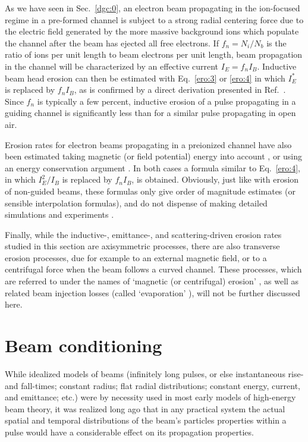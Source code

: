 \documentclass [12pt,a4paper,     ]{report} %
\begin{document}
    As we have seen in Sec.~\ref{dgc:0}, an electron beam propagating in the ion-focused regime in a pre-formed channel is subject to a strong radial centering force due to the electric field generated by the more massive background ions which populate the channel after the beam has ejected all free electrons.  If $f_n = N_i/N_b$ is the ratio of ions per unit length to beam electrons per unit length, beam propagation in the channel will be characterized by an effective current $I_E=f_nI_B$.   Inductive beam head erosion can then be estimated with Eq.~\eqref{ero:3} or \eqref{ero:4} in which $I_E^*$ is replaced by $f_nI_B$, as is confirmed by a direct derivation presented in Ref.~\cite[p.225]{BUCHA1987-}.  Since $f_n$ is typically a few percent, inductive erosion of a pulse propagating in a guiding channel is significantly less than for a similar pulse propagating in open air.

   Erosion rates for electron beams propagating in a preionized channel have also been estimated taking magnetic (or field potential) energy into account \cite{KRALL1989A}, or using an energy conservation argument \cite{MOSTR1996-}.  In both cases a formula similar to Eq.~\eqref{ero:4}, in which $I_E^2/I_B$ is replaced by $f_nI_B$, is obtained.  Obviously, just like with erosion of non-guided beams, these formulas only give order of magnitude estimates (or sensible interpolation formulas), and do not dispense of making detailed simulations and experiments \cite{KRALL1989A,WERNE1994-,MOSTR1996-}.

Finally, while the inductive-, emittance-, and scattering-driven erosion rates studied in this section are axisymmetric processes, there are also transverse erosion processes, due for example to an external magnetic field, or to a centrifugal force when the beam follows a curved channel.   These processes, which are referred to under the names of `magnetic (or centrifugal) erosion' \cite{WERNE1994-,MOSTR1996-}, as well as related beam injection losses (called  `evaporation' \cite{MOSTR1996-}), will not be further discussed here.


\section{Beam conditioning}
\label{bco:0}

While idealized models of beams (infinitely long pulses, or else instantaneous rise- and fall-times; constant radius; flat radial distributions;  constant energy, current, and emittance; etc.) were by necessity used in most early models of high-energy beam theory, it was realized long ago that in any practical system the actual spatial and temporal distributions of the beam's particles properties within a pulse would have a considerable effect on its propagation properties.
\end{document}
